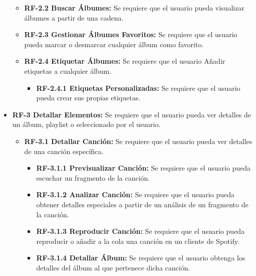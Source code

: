 \begin{itemize}
\begin{itemize}
            \item 
                \textbf{RF-2.2 Buscar Álbumes:} Se requiere que el usuario pueda visualizar álbumes a partir de una cadena.
            \item
                \textbf{RF-2.3 Gestionar Álbumes Favoritos:} Se requiere que el usuario pueda marcar o desmarcar cualquier álbum como favorito.
            \item
                \textbf{RF-2.4 Etiquetar Álbumes:} Se requiere que el usuario Añadir etiquetas a cualquier álbum.
                \begin{itemize}
                    \item 
                    \textbf{RF-2.4.1 Etiquetas Personalizadas:} Se requiere que el usuario pueda crear sus propias etiquetas.
                \end{itemize}
        \end{itemize}

    \item
        \textbf{RF-3 Detallar Elementos:} Se requiere que el usuario pueda ver detalles de un álbum, playlist o seleccionado por el usuario.
            \begin{itemize}
                \item 
                \textbf{RF-3.1 Detallar Canción:} Se requiere que el usuario pueda ver detalles de una canción específica.
                    \begin{itemize}
                        \item 
                            \textbf{RF-3.1.1 Previsualizar Canción:} Se requiere que el usuario pueda escuchar un fragmento de la canción.
                        \item
                            \textbf{RF-3.1.2 Analizar Canción:} Se requiere que el usuario pueda obtener detalles especiales a partir de un análisis de un fragmento de la canción.
                        \item
                            \textbf{RF-3.1.3 Reproducir Canción:} Se requiere que el usuario pueda reproducir o añadir a la cola una canción en un cliente de Spotify.
                        \item
                            \textbf{RF-3.1.4 Detallar Álbum:} Se requiere que el usuario obtenga los detalles del álbum al que pertenece dicha canción.

                    \end{itemize}
                    

\end{itemize}
\end{itemize}
